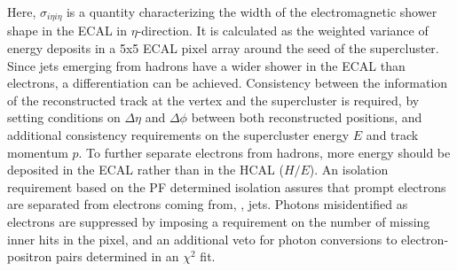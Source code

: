 Here, $\sigma_{i\eta i\eta}$ is a quantity characterizing the width of the electromagnetic shower shape in the ECAL in $\eta$-direction. It is calculated as the weighted variance of energy deposits in a 5x5 ECAL pixel array around the seed of the supercluster. Since jets emerging from hadrons have a wider shower in the ECAL than electrons, a differentiation can be achieved. Consistency between the information of the reconstructed track at the vertex and the supercluster is required, by setting conditions on $\Delta\eta$ and $\Delta\phi$ between both reconstructed positions, and additional consistency requirements on the supercluster energy $E$ and track momentum $p$. To further separate electrons from hadrons, more energy should be deposited in the ECAL rather than in the HCAL ($H/E$). An isolation requirement based on the PF determined isolation assures that prompt electrons are separated from electrons coming from, \eg, jets. Photons misidentified as electrons are suppressed by imposing a requirement on the number of missing inner hits in the pixel, and an additional veto for photon conversions to electron-positron pairs determined in an $\chi^2$ fit.

